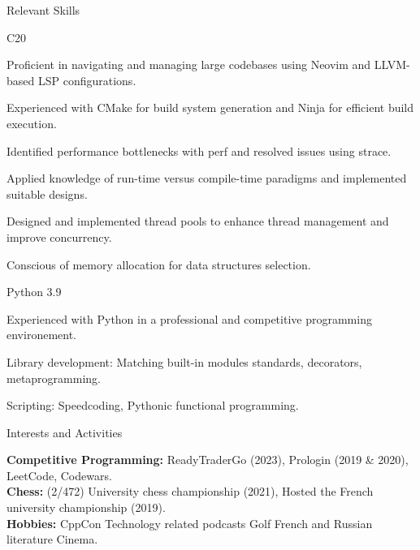 \documentclass[
	a4paper, %
	10pt, %
]{resume} %
\def\CC{{C\nolinebreak[4]\hspace{-.05em}\raisebox{.4ex}{\tiny\bf ++}}}
\begin{document}
\begin{rSection}{Relevant Skills}
	\begin{rSubsection}{\CC20}{}{}{}
    \item Proficient in navigating and managing large codebases using Neovim and LLVM-based LSP configurations.
    \item Experienced with CMake for build system generation and Ninja for efficient build execution.
    \item Identified performance bottlenecks with perf and resolved issues using strace.
    \item Applied knowledge of run-time versus compile-time paradigms and implemented suitable designs.
    \item Designed and implemented thread pools to enhance thread management and improve concurrency.
    \item Conscious of memory allocation for data structures selection.
	\end{rSubsection}
  \begin{rSubsection}{Python 3.9}{}{}{}
    \item Experienced with Python in a professional and competitive programming environement.
    \item Library development: Matching built-in modules standards, decorators, metaprogramming.
    \item Scripting: Speedcoding, Pythonic functional programming.
  \end{rSubsection}
\end{rSection}


\begin{rSection}{Interests and Activities}

	\textbf{Competitive Programming:} ReadyTraderGo (2023), Prologin (2019 \& 2020), LeetCode, Codewars. \\
	\textbf{Chess:} (2/472) University chess championship (2021), Hosted the French university championship (2019).\\
  \textbf{Hobbies:} CppCon  Technology related podcasts  Golf  French and Russian literature  Cinema.
\end{rSection}
\end{document}
